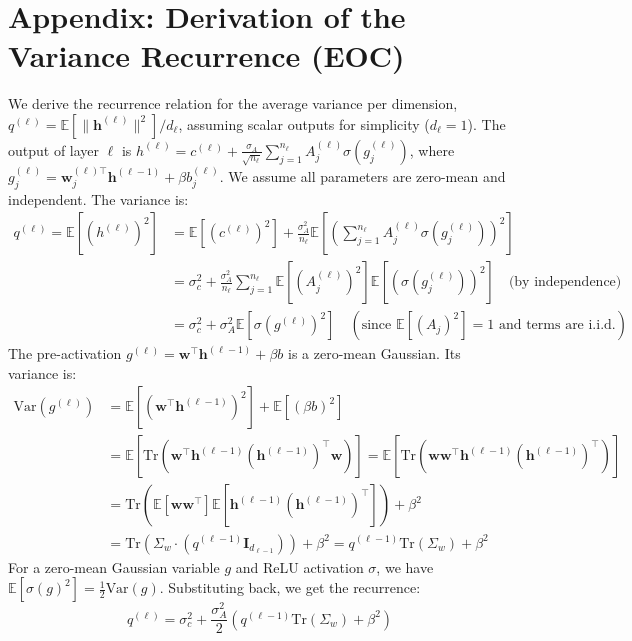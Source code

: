 \documentclass[12pt]{article}
\begin{document}
\appendix
\section{Appendix: Derivation of the Variance Recurrence (EOC)}
We derive the recurrence relation for the average variance per dimension, $q^{(\ell)} = \mathbb{E}[\|\bm{h}^{(\ell)}\|^2]/d_\ell$, assuming scalar outputs for simplicity ($d_\ell=1$).
The output of layer $\ell$ is $h^{(\ell)} = c^{(\ell)} + \frac{\sigma_A}{\sqrt{n_\ell}} \sum_{j=1}^{n_\ell} A_j^{(\ell)} \sigma(g_j^{(\ell)})$, where $g_j^{(\ell)} = \bm{w}_j^{(\ell)\top} \bm{h}^{(\ell-1)} + \beta b_j^{(\ell)}$.
We assume all parameters are zero-mean and independent. The variance is:
\begin{align*}
    q^{(\ell)} = \mathbb{E}[(h^{(\ell)})^2] &= \mathbb{E}[(c^{(\ell)})^2] + \frac{\sigma_A^2}{n_\ell} \mathbb{E}\left[ \left( \sum_{j=1}^{n_\ell} A_j^{(\ell)} \sigma(g_j^{(\ell)}) \right)^2 \right] \\
    &= \sigma_c^2 + \frac{\sigma_A^2}{n_\ell} \sum_{j=1}^{n_\ell} \mathbb{E}[(A_j^{(\ell)})^2] \mathbb{E}[(\sigma(g_j^{(\ell)}))^2] \quad \text{(by independence)} \\
    &= \sigma_c^2 + \sigma_A^2 \mathbb{E}[\sigma(g^{(\ell)})^2] \quad (\text{since } \mathbb{E}[(A_j)^2]=1 \text{ and terms are i.i.d.})
\end{align*}
The pre-activation $g^{(\ell)} = \bm{w}^\top \bm{h}^{(\ell-1)} + \beta b$ is a zero-mean Gaussian. Its variance is:
\begin{align*}
    \text{Var}(g^{(\ell)}) &= \mathbb{E}[(\bm{w}^\top \bm{h}^{(\ell-1)})^2] + \mathbb{E}[(\beta b)^2] \\
    &= \mathbb{E}[\text{Tr}(\bm{w}^\top \bm{h}^{(\ell-1)} (\bm{h}^{(\ell-1)})^\top \bm{w})] = \mathbb{E}[\text{Tr}(\bm{w}\bm{w}^\top \bm{h}^{(\ell-1)}(\bm{h}^{(\ell-1)})^\top)] \\
    &= \text{Tr}(\mathbb{E}[\bm{w}\bm{w}^\top] \mathbb{E}[\bm{h}^{(\ell-1)}(\bm{h}^{(\ell-1)})^\top]) + \beta^2 \\
    &= \text{Tr}(\Sigma_w \cdot (q^{(\ell-1)} \mathbf{I}_{d_{\ell-1}})) + \beta^2 = q^{(\ell-1)}\text{Tr}(\Sigma_w) + \beta^2
\end{align*}
For a zero-mean Gaussian variable $g$ and ReLU activation $\sigma$, we have $\mathbb{E}[\sigma(g)^2] = \frac{1}{2}\text{Var}(g)$.
Substituting back, we get the recurrence:
\[ q^{(\ell)} = \sigma_c^2 + \frac{\sigma_A^2}{2} \left( q^{(\ell-1)}\text{Tr}(\Sigma_w) + \beta^2 \right) \]
\end{document}

